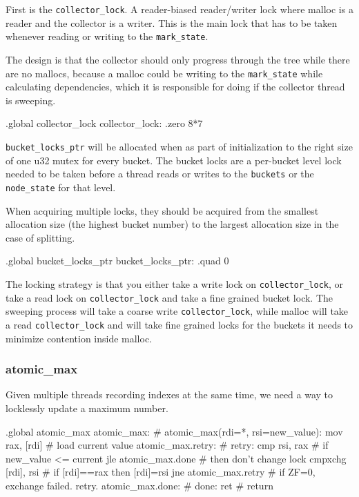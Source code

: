 First is the \lstinline|collector_lock|. A reader-biased reader/writer lock
where malloc is a reader and the collector is a writer. This is the main lock
that has to be taken whenever reading or writing to the \lstinline|mark_state|.

The design is that the collector should only progress through the tree while
there are no mallocs, because a malloc could be writing to the
\lstinline|mark_state| while calculating dependencies, which it is responsible
for doing if the collector thread is sweeping.

\begin{asmdata}
.global collector_lock
collector_lock:
	.zero	8*7
\end{asmdata}

\lstinline|bucket_locks_ptr| will be allocated when as part of initialization
to the right size of one u32 mutex for every bucket. The bucket locks are a
per-bucket level lock needed to be taken before a thread reads or writes to the
\lstinline|buckets| or the \lstinline|node_state| for that level.

When acquiring multiple locks, they should be acquired from the smallest
allocation size (the highest bucket number) to the largest allocation size
in the case of splitting.

\begin{asmdata}
.global bucket_locks_ptr
bucket_locks_ptr: .quad 0
\end{asmdata}

The locking strategy is that you either take a write lock on
\lstinline|collector_lock|, or take a read lock on \lstinline|collector_lock|
and take a fine grained bucket lock. The sweeping process will take a coarse
write \lstinline|collector_lock|, while malloc will take a read
\lstinline|collector_lock| and will take fine grained locks for the buckets it
needs to minimize contention inside malloc.

\subsubsection{atomic\_max}

Given multiple threads recording indexes at the same time, we need a way to
locklessly update a maximum number.

\begin{asm}
.global atomic_max
atomic_max:                                 # atomic_max(rdi=*, rsi=new_value):
	mov	rax, [rdi]                  #   load current value
atomic_max.retry:                           # retry:
	cmp	rsi, rax                    #   if new_value <= current
	jle	atomic_max.done             #   then don't change
	lock cmpxchg [rdi], rsi             #   if [rdi]==rax then [rdi]=rsi
	jne	atomic_max.retry            #   if ZF=0, exchange failed. retry.
atomic_max.done:                            # done:
	ret                                 #   return
\end{asm}

